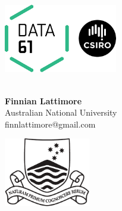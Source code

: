 \documentclass[a3,portrait,14pt]{sciposter}
\begin{document}
\def\ci{\perp\!\!\!\perp}

\begin{minipage}[t]{0.15\linewidth}%
\centering
\includegraphics[height=3cm]{data61} %
\end{minipage}
\begin{minipage}[b]{0.65\linewidth}
\centering
{}
 \color{Black}\\ 

\textbf{Finnian Lattimore}\\ %
Australian National University\\ %
finnlattimore@gmail.com

\end{minipage}
\begin{minipage}[t]{0.15\linewidth}
\centering
\includegraphics[height=3cm]{anu-logo-notext}
\end{minipage}


\end{document}
